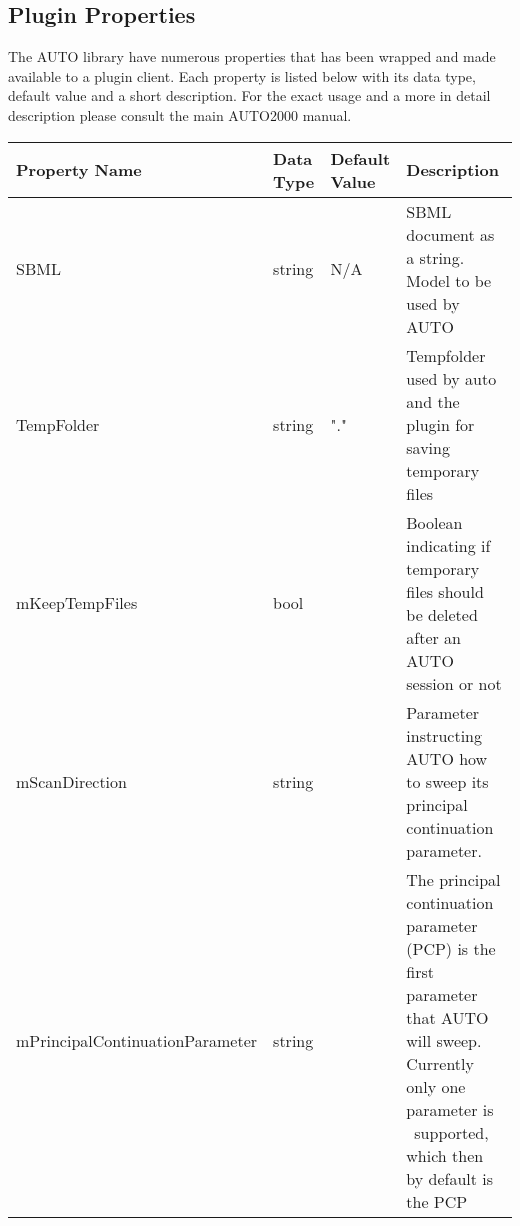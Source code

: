 \begin{landscape}
\section{Plugin Properties}
The AUTO library have numerous properties that has been wrapped and made available to a plugin client. Each property is listed below with its data type, default value and 
a short description. For the exact usage and a more in detail description please consult the main AUTO2000 manual.


\centering %
\begin{longtable}{p{4cm} l p{3cm}  p{10cm}} %

Property Name & Data Type & Default Value  & Description \\ [0.5ex] %
\hline %
SBML                                &   string              & N/A       &   SBML document as a string. Model to be used by AUTO \\
TempFolder                          &   string              & "."       &   Tempfolder used by auto and the plugin for saving temporary files \\
mKeepTempFiles                      &   bool                &           &   Boolean indicating if temporary files should be deleted after an AUTO session or not \\
mScanDirection                      &   string              &           &   Parameter instructing AUTO how to sweep its principal continuation parameter. \\
mPrincipalCont\-inuationParameter   &   string              &           &   The principal continuation parameter (PCP) is the first parameter that AUTO will sweep. Currently only one parameter is \
                                                                            supported, which then by default is the PCP\\



\end{longtable}
\end{landscape}
